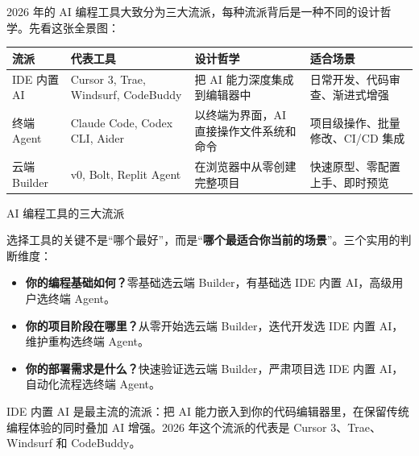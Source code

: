 


2026 年的 AI 编程工具大致分为三大流派，每种流派背后是一种不同的设计哲学。先看这张全景图：

\begin{center}
\begin{tabularx}{\linewidth}{|X|X|X|X|}
\hline
\textbf{流派} & \textbf{代表工具} & \textbf{设计哲学} & \textbf{适合场景} \tabularnewline
\hline
IDE 内置 AI & Cursor 3, Trae, Windsurf, CodeBuddy & 把 AI 能力深度集成到编辑器中 & 日常开发、代码审查、渐进式增强 \tabularnewline
终端 Agent & Claude Code, Codex CLI, Aider & 以终端为界面，AI 直接操作文件系统和命令 & 项目级操作、批量修改、CI/CD 集成 \tabularnewline
云端 Builder & v0, Bolt, Replit Agent & 在浏览器中从零创建完整项目 & 快速原型、零配置上手、即时预览 \tabularnewline
\hline
\end{tabularx}
\end{center}

\begin{center}\small\color{gray}AI 编程工具的三大流派\end{center}

选择工具的关键不是“哪个最好”，而是“\textbf{哪个最适合你当前的场景}”。三个实用的判断维度：

\begin{itemize}
  \item \textbf{你的编程基础如何？}零基础选云端 Builder，有基础选 IDE 内置 AI，高级用户选终端 Agent。
  \item \textbf{你的项目阶段在哪里？}从零开始选云端 Builder，迭代开发选 IDE 内置 AI，维护重构选终端 Agent。
  \item \textbf{你的部署需求是什么？}快速验证选云端 Builder，严肃项目选 IDE 内置 AI，自动化流程选终端 Agent。
\end{itemize}


IDE 内置 AI 是最主流的流派：把 AI 能力嵌入到你的代码编辑器里，在保留传统编程体验的同时叠加 AI 增强。2026 年这个流派的代表是 Cursor 3、Trae、Windsurf 和 CodeBuddy。



